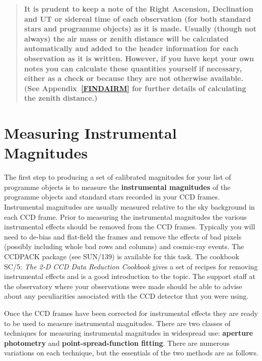 \documentclass[twoside,11pt]{article}
\newcommand{\xref}[3]{#1}
\newcommand{\xlabel}[1]{}
\begin{document}
\begin{quote}
{\bf It is prudent to keep a note of the Right Ascension, Declination and
UT or sidereal time of each observation (for both standard stars and
programme objects) as it is made.  Usually (though not always) the air
mass or zenith distance will be calculated automatically and added to the
header information for each observation as it is written.  However, if you
have kept your own notes you can calculate these quantities yourself
if necessary, either as a check or because they are not otherwise
available. (See Appendix~\ref{FINDAIRM} for further details of
calculating the zenith distance.)}
\end{quote}


\section{\xlabel{MEASURE_INSTR}\label{MEASURE_INSTR}Measuring
Instrumental Magnitudes}

The first step to producing a set of calibrated magnitudes for your
list of programme objects is to measure the {\bf instrumental
magnitudes} of the programme objects and standard stars recorded in
your CCD frames.  Instrumental magnitudes are usually measured relative
to the sky background in each CCD frame.  Prior to measuring the
instrumental magnitudes the various instrumental effects should be
removed from the CCD frames.  Typically you will need to de-bias and
flat-field the frames and remove the effects of bad pixels (possibly
including whole bad rows and columns) and cosmic-ray events.  The
CCDPACK package (see \xref{SUN/139}{sun139}{}\cite{SUN139}) is available
for this task.  The cookbook \xref{SC/5: {\it The 2-D CCD Data Reduction
Cookbook}}{sc5}{}\/\cite{SC5} gives a set of recipes for removing
instrumental effects and is a good introduction to the topic.  The support
staff at the observatory where your observations were made should be able
to advise about any peculiarities associated with the CCD detector that
you were using.

Once the CCD frames have been corrected for instrumental effects they
are ready to be used to measure instrumental magnitudes.  There are
two classes of techniques for measuring instrumental magnitudes in
widespread use: {\bf aperture photometry} and {\bf point-spread-function
fitting}.  There are numerous variations on each technique, but the
essentials of the two methods are as follows.
\end{document}
